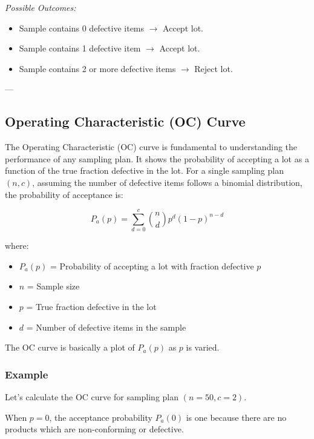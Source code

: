 \documentclass[twoside]{book}
\begin{document}
\textit{Possible Outcomes:}
\begin{itemize}
    \item Sample contains 0 defective items $\rightarrow$ Accept lot.
    \item Sample contains 1 defective item $\rightarrow$ Accept lot.
    \item Sample contains 2 or more defective items $\rightarrow$ Reject lot.
\end{itemize}

---

\subsection{Operating Characteristic (OC) Curve}

The Operating Characteristic (OC) curve is fundamental to understanding the performance of any sampling plan. It shows the probability of accepting a lot as a function of the true fraction defective in the lot. For a single sampling plan $(n, c)$, assuming the number of defective items follows a binomial distribution, the probability of acceptance is:

$$P_a(p) = \sum_{d=0}^{c} \binom{n}{d} p^d (1-p)^{n-d}$$

where:
\begin{itemize}
    \item $P_a(p)$ = Probability of accepting a lot with fraction defective $p$
    \item $n$ = Sample size
    \item $p$ = True fraction defective in the lot
    \item $d$ = Number of defective items in the sample
\end{itemize}
The OC curve is basically a plot of $P_a(p)$ as $p$ is varied.

\subsubsection{Example}

Let's calculate the OC curve for sampling plan $(n=50, c=2)$.

When $p = 0$, the acceptance probability $P_a(0)$ is one because there are no products which are non-conforming or defective.
\end{document}

